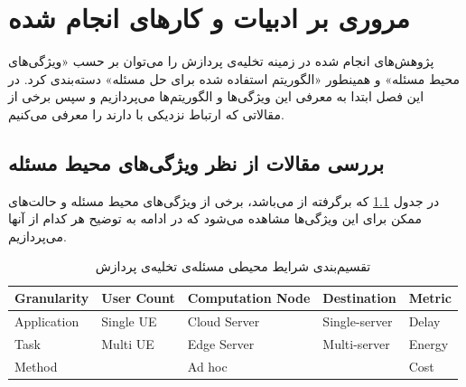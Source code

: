 \chapter{مروری بر ادبیات و کارهای انجام شده}
پژوهش‌های انجام شده در زمینه تخلیه‌ی پردازش را می‌توان بر حسب «ویژگی‌های محیط مسئله» و همینطور «الگوریتم استفاده شده برای حل مسئله» دسته‌بندی کرد. در این فصل ابتدا به معرفی این ویژگی‌ها و الگوریتم‌ها می‌پردازیم و سپس برخی از مقالاتی که ارتباط نزدیکی با \CurrentProject دارند را معرفی می‌کنیم.

\section[ویژگی‌های محیط مسئله]{بررسی مقالات از نظر ویژگی‌های محیط مسئله} 
در جدول \ref{table:mohit} که برگرفته از \cite{wang2019} می‌باشد، برخی از ویژگی‌های محیط مسئله و حالت‌های ممکن برای این ویژگی‌ها مشاهده می‌شود که در ادامه به توضیح هر کدام از آنها می‌پردازیم.
\begin{table}[H]
	\centering
	\begin{latin}

\begin{tabular}{@{}lllll@{}}
	\toprule
	\textbf{Granularity} & \textbf{User Count} & \textbf{Computation Node} & \textbf{Destination} & \textbf{Metric} \\ \midrule
	Application          & Single UE             & Cloud Server      & Single-server        & Delay           \\
	Task                 & Multi UE   & Edge Server       & Multi-server         & Energy          \\
	Method               &             & Ad hoc            &                      & Cost            \\ \bottomrule
\end{tabular}
	\end{latin}
	\caption{تقسیم‌بندی شرایط محیطی مسئله‌ی تخلیه‌ی پردازش}
	\label{table:mohit}
\end{table}

